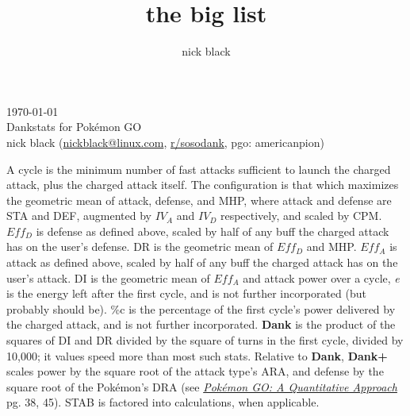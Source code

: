 \documentclass[ebook,10pt,openany,oneside]{memoir}
\title{the big list}
\author{nick black}
\begin{document}
\noindent{}\today\\
Dankstats for Pokémon GO\\
nick black (\href{mailto:nickblack@linux.com}{nickblack@linux.com}, \href{https://www.reddit.com/user/sosodank/}{r/sosodank}, pgo: americanpion)\\
\bigskip

A cycle is the minimum number of fast attacks sufficient to launch the charged attack, plus the charged attack itself.
The configuration is that which maximizes the geometric mean of attack, defense, and MHP, where attack and defense are STA and DEF, augmented by $IV_A$ and $IV_D$ respectively, and scaled by CPM.
$Eff_D$ is defense as defined above, scaled by half of any buff the charged attack has on the user's defense.
DR is the geometric mean of $Eff_D$ and MHP.
$Eff_A$ is attack as defined above, scaled by half of any buff the charged attack has on the user's attack.
DI is the geometric mean of $Eff_A$ and attack power over a cycle,
\textit{e} is the energy left after the first cycle, and is not further incorporated (but probably should be).
\%c is the percentage of the first cycle's power delivered by the charged attack, and is not further incorporated.
\textbf{Dank} is the product of the squares of DI and DR divided by the square of turns in the first cycle, divided by 10,000; it values speed more than most such stats.
Relative to \textbf{Dank}, \textbf{Dank+} scales power by the square root of the attack type's ARA, and defense by the square root of the Pokémon's DRA (see \textit{\href{https://nick-black.com/pgo-quantitative.pdf}{Pokémon GO: A Quantitative Approach}} pg. 38, 45).
STAB is factored into calculations, when applicable.
\bigskip

\footnotesize
\setlength{\tabcolsep}{2pt}



\end{document}
